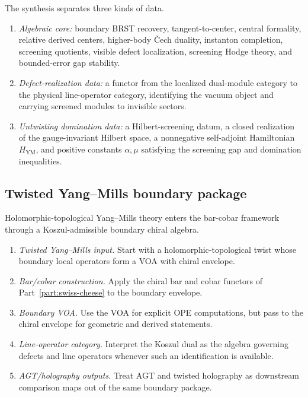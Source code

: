 \begin{remark}
The synthesis separates three kinds of data.
\begin{enumerate}[label=(\alph*)]
\item \emph{Algebraic core:} boundary BRST recovery, tangent-to-center, central formality,
relative derived centers, higher-body \v{C}ech duality, instanton completion, screening quotients,
visible defect localization, screening Hodge theory, and bounded-error gap stability.
\item \emph{Defect-realization data:} a functor from the localized dual-module category to the
physical line-operator category, identifying the vacuum object and carrying screened modules to invisible sectors.
\item \emph{Untwisting domination data:} a Hilbert-screening datum, a closed realization of the
gauge-invariant Hilbert space, a nonnegative self-adjoint Hamiltonian $H_{\mathrm{YM}}$, and positive
constants $\alpha,\mu$ satisfying the screening gap and domination inequalities.
\end{enumerate}
\end{remark}



\subsection{Twisted Yang--Mills boundary package}

\begin{summary}
Holomorphic-topological Yang--Mills theory enters the bar-cobar framework through a
Koszul-admissible boundary chiral algebra.

\begin{enumerate}[label=(\roman*)]
\item \emph{Twisted Yang--Mills input.} Start with a holomorphic-topological twist whose
boundary local operators form a VOA with chiral envelope.
\item \emph{Bar/cobar construction.} Apply the chiral bar and cobar functors of Part~\ref{part:swiss-cheese} to the
boundary envelope.
\item \emph{Boundary VOA.} Use the VOA for explicit OPE computations, but pass to the chiral
envelope for geometric and derived statements.
\item \emph{Line-operator category.} Interpret the Koszul dual as the algebra governing defects
and line operators whenever such an identification is available.
\item \emph{AGT/holography outputs.} Treat AGT and twisted holography as downstream comparison
maps out of the same boundary package.
\end{enumerate}
\end{summary}

